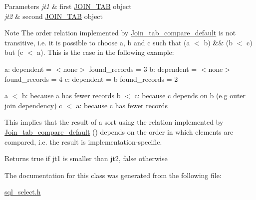 \begin{DoxyParams}{Parameters}
{\em jt1} & first \mbox{\hyperlink{classJOIN__TAB}{J\+O\+I\+N\+\_\+\+T\+AB}} object \\
\hline
{\em jt2} & second \mbox{\hyperlink{classJOIN__TAB}{J\+O\+I\+N\+\_\+\+T\+AB}} object\\
\hline
\end{DoxyParams}
\begin{DoxyNote}{Note}
The order relation implemented by \mbox{\hyperlink{classJoin__tab__compare__default}{Join\+\_\+tab\+\_\+compare\+\_\+default}} is not transitive, i.\+e. it is possible to choose a, b and c such that (a $<$ b) \&\& (b $<$ c) but (c $<$ a). This is the case in the following example\+:
\end{DoxyNote}
a\+: dependent = $<$none$>$ found\+\_\+records = 3 b\+: dependent = $<$none$>$ found\+\_\+records = 4 c\+: dependent = b found\+\_\+records = 2

a $<$ b\+: because a has fewer records b $<$ c\+: because c depends on b (e.\+g outer join dependency) c $<$ a\+: because c has fewer records

This implies that the result of a sort using the relation implemented by \mbox{\hyperlink{classJoin__tab__compare__default}{Join\+\_\+tab\+\_\+compare\+\_\+default}} () depends on the order in which elements are compared, i.\+e. the result is implementation-\/specific.

\begin{DoxyReturn}{Returns}
true if jt1 is smaller than jt2, false otherwise 
\end{DoxyReturn}


The documentation for this class was generated from the following file\+:\begin{DoxyCompactItemize}
\item 
\mbox{\hyperlink{sql__select_8h}{sql\+\_\+select.\+h}}\end{DoxyCompactItemize}
